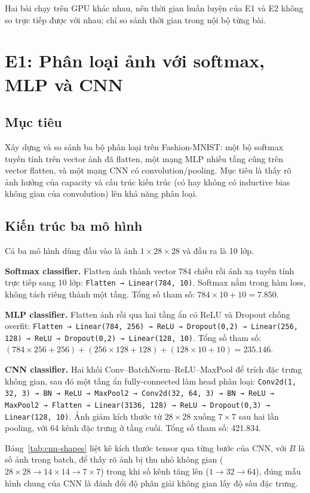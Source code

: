 \documentclass[12pt,a4paper]{article}
\begin{document}
Hai bài chạy trên GPU khác nhau, nên thời gian huấn luyện của E1 và E2 không
so trực tiếp được với nhau; chỉ so sánh thời gian trong nội bộ từng bài.

\clearpage
\section{E1: Phân loại ảnh với softmax, MLP và CNN}

\subsection{Mục tiêu}

Xây dựng và so sánh ba bộ phân loại trên Fashion-MNIST: một bộ softmax tuyến
tính trên vector ảnh đã flatten, một mạng MLP nhiều tầng cũng trên vector
flatten, và một mạng CNN có convolution/pooling. Mục tiêu là thấy rõ ảnh hưởng
của capacity và cấu trúc kiến trúc (có hay không có inductive bias không gian
của convolution) lên khả năng phân loại.

\subsection{Kiến trúc ba mô hình}

Cả ba mô hình dùng đầu vào là ảnh $1 \times 28 \times 28$ và đầu ra là 10 lớp.

\textbf{Softmax classifier.} Flatten ảnh thành vector 784 chiều rồi ánh xạ
tuyến tính trực tiếp sang 10 lớp: \texttt{Flatten → Linear(784, 10)}. Softmax
nằm trong hàm loss, không tách riêng thành một tầng. Tổng số tham số:
$784 \times 10 + 10 = 7.850$.

\textbf{MLP classifier.} Flatten ảnh rồi qua hai tầng ẩn có ReLU và Dropout
chống overfit: \texttt{Flatten → Linear(784, 256) → ReLU → Dropout(0,2) →
Linear(256, 128) → ReLU → Dropout(0,2) → Linear(128, 10)}. Tổng số tham số:
$(784{\times}256{+}256) + (256{\times}128{+}128) + (128{\times}10{+}10) =
235.146$.

\textbf{CNN classifier.} Hai khối Conv--BatchNorm--ReLU--MaxPool để trích
đặc trưng không gian, sau đó một tầng ẩn fully-connected làm head phân loại:
\texttt{Conv2d(1, 32, 3) → BN → ReLU → MaxPool2 → Conv2d(32, 64, 3) → BN →
ReLU → MaxPool2 → Flatten → Linear(3136, 128) → ReLU → Dropout(0,3) →
Linear(128, 10)}. Ảnh giảm kích thước từ $28{\times}28$ xuống $7{\times}7$ sau
hai lần pooling, với 64 kênh đặc trưng ở tầng cuối. Tổng số tham số: 421.834.

Bảng~\ref{tab:cnn-shapes} liệt kê kích thước tensor qua từng bước của CNN, với
$B$ là số ảnh trong batch, để thấy rõ ảnh bị thu nhỏ không gian ($28{\times}28
\to 14{\times}14 \to 7{\times}7$) trong khi số kênh tăng lên ($1 \to 32 \to
64$), đúng mẫu hình chung của CNN là đánh đổi độ phân giải không gian lấy độ
sâu đặc trưng.
\end{document}
